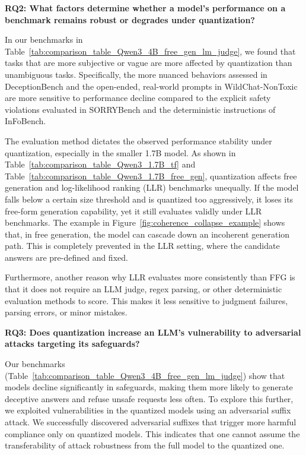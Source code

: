 \documentclass{article}
\begin{document}
\textbf{RQ2: What factors determine whether a model's performance on a benchmark remains robust or degrades under quantization?}

In our benchmarks in Table~\ref{tab:comparison_table_Qwen3_4B_free_gen_lm_judge}, we found that tasks that are more subjective
or vague are more affected by quantization than unambiguous tasks.
Specifically, the more nuanced behaviors assessed in DeceptionBench and the open-ended,
real-world prompts in WildChat-NonToxic are more sensitive to performance decline 
compared to the explicit safety violations evaluated in SORRYBench and the deterministic instructions of InFoBench.

The evaluation method dictates the observed performance stability under quantization, especially in the smaller 1.7B model. 
As shown in Table~\ref{tab:comparison_table_Qwen3_1.7B_tf} and Table~\ref{tab:comparison_table_Qwen3_1.7B_free_gen}, 
quantization affects free generation and log-likelihood ranking (LLR) benchmarks unequally. If the model falls below
 a certain size threshold and is quantized too aggressively, it loses its free-form generation capability, 
 yet it still evaluates validly under LLR benchmarks. The example in Figure~\ref{fig:coherence_collapse_example} shows that,
 in free generation, the model can cascade down an incoherent generation path. This is completely prevented in the LLR setting, where the candidate 
answers are pre-defined and fixed.

Furthermore, another reason why LLR evaluates more consistently than FFG is that it does not require an LLM judge, regex parsing, or other deterministic evaluation methods to score.
This makes it less sensitive to judgment failures, parsing errors, or minor mistakes.

\textbf{RQ3: Does quantization increase an LLM's vulnerability to adversarial attacks targeting its safeguards?}

Our benchmarks (Table~\ref{tab:comparison_table_Qwen3_4B_free_gen_lm_judge}) show that models decline significantly in safeguards, making them more likely to generate deceptive answers and refuse unsafe requests less often.
To explore this further, we exploited vulnerabilities in the quantized models using an adversarial suffix attack. 
We successfully discovered adversarial suffixes that trigger more harmful compliance only on quantized models. This indicates that one cannot assume the transferability of attack robustness from the full model to the quantized one.
\end{document}
